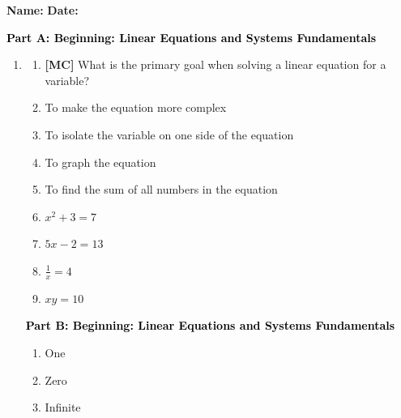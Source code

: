 \documentclass[12pt, letterpaper, fleqn]{article}
\begin{document}
\textbf{Name:} \underline{\hspace{5cm}}
\hfill
\textbf{Date:} \underline{\hspace{3cm}}\\

\vspace{5mm}

\begin{tcolorbox}[colback=customteal!20]
\large\textcolor{black}{\textbf{Part A: Beginning: Linear Equations and Systems Fundamentals}}
\end{tcolorbox}

\vspace{3mm}

\begin{enumerate}[itemsep=2.5cm, leftmargin=0.6cm]
\item \begin{enumerate}[label=\Alph*)]
\item \textbf{[MC]} What is the primary goal when solving a linear equation for a variable?
\item To make the equation more complex
\item To isolate the variable on one side of the equation
\item To graph the equation
\item To find the sum of all numbers in the equation

\item $x^2 + 3 = 7$
\item $5x - 2 = 13$
\item $\frac{1}{x} = 4$
\item $xy = 10$

\end{enumerate}

\newpage

\begin{tcolorbox}[colback=customteal!20]
\large\textcolor{black}{\textbf{Part B: Beginning: Linear Equations and Systems Fundamentals}}
\end{tcolorbox}

\vspace{3mm}

\begin{enumerate}[itemsep=2.5cm, leftmargin=0.6cm, resume]
\item One
\item Zero
\item Infinite


\end{enumerate}
\end{enumerate}
\end{document}

